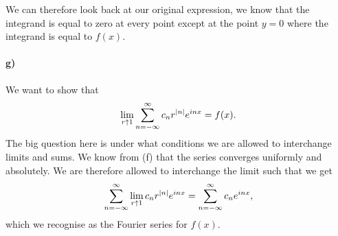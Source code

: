 \documentclass[a4paper]{article}
\begin{document}
We can therefore look back at our original expression, we know that the
integrand is equal to zero at every point except at the point $y = 0$ where the
integrand is equal to $f(x)$.

\paragraph{g)}
We want to show that
\begin{equation}
  \notag
  \lim\limits_{r\uparrow 1}\sum_{n=-\infty}^{\infty} c_nr^{|n|}e^{inx} = f(x).
\end{equation}
The big question here is under what conditions we are allowed to interchange limits and sums.
We know from (f) that the series converges uniformly and absolutely. We are therefore allowed to interchange the limit
such that we get
\begin{equation}
  \notag
  \sum_{n=-\infty}^{\infty}\lim\limits_{r\uparrow 1} c_nr^{|n|}e^{inx} = \sum_{n=-\infty}^{\infty}c_ne^{inx},
\end{equation}
which we recognise as the Fourier series for $f(x)$.
\end{document}
